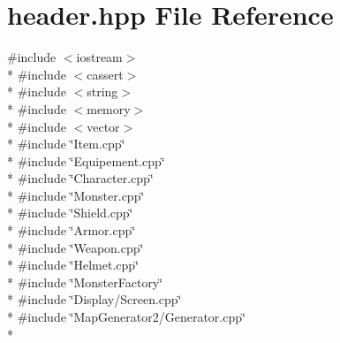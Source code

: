 \section{header.\-hpp File Reference}
\label{header_8hpp}
{\ttfamily \#include $<$iostream$>$}\\*
{\ttfamily \#include $<$cassert$>$}\\*
{\ttfamily \#include $<$string$>$}\\*
{\ttfamily \#include $<$memory$>$}\\*
{\ttfamily \#include $<$vector$>$}\\*
{\ttfamily \#include \char`\"{}Item.\-cpp\char`\"{}}\\*
{\ttfamily \#include \char`\"{}Equipement.\-cpp\char`\"{}}\\*
{\ttfamily \#include \char`\"{}Character.\-cpp\char`\"{}}\\*
{\ttfamily \#include \char`\"{}Monster.\-cpp\char`\"{}}\\*
{\ttfamily \#include \char`\"{}Shield.\-cpp\char`\"{}}\\*
{\ttfamily \#include \char`\"{}Armor.\-cpp\char`\"{}}\\*
{\ttfamily \#include \char`\"{}Weapon.\-cpp\char`\"{}}\\*
{\ttfamily \#include \char`\"{}Helmet.\-cpp\char`\"{}}\\*
{\ttfamily \#include \char`\"{}Monster\-Factory\char`\"{}}\\*
{\ttfamily \#include \char`\"{}Display/\-Screen.\-cpp\char`\"{}}\\*
{\ttfamily \#include \char`\"{}Map\-Generator2/\-Generator.\-cpp\char`\"{}}\\*
